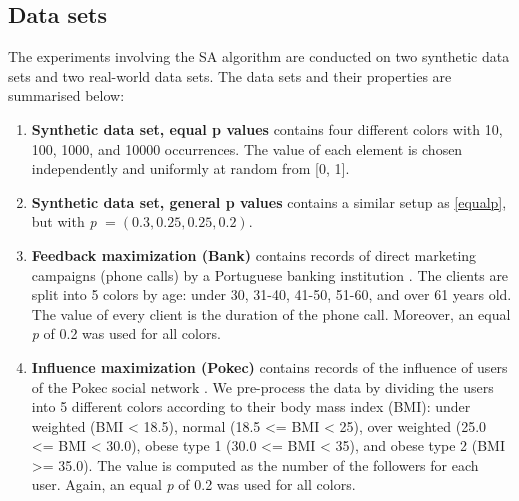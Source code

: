 
\subsection{Data sets}
The experiments involving the SA algorithm are conducted on two synthetic data sets and two real-world data sets. The data sets and their properties are summarised below:

\begin{enumerate}
    \item \textbf{Synthetic data set, equal p values} contains four different colors with 10, 100, 1000, and 10000 occurrences. The value of each element is chosen independently and uniformly at random from [0, 1]. \label{equalp}
    \item \textbf{Synthetic data set, general p values} contains a similar setup as \ref{equalp}, but with \textit{p} $= (0.3, 0.25, 0.25, 0.2)$.
    \item \textbf{Feedback maximization (Bank)} contains records of direct marketing campaigns (phone calls) by a Portuguese banking institution \citep{bankport}. The clients are split into 5 colors by age: under 30, 31-40, 41-50, 51-60, and over 61 years old. The value of every client is the duration of the phone call. Moreover, an equal \textit{p} of 0.2 was used for all colors.

    \item \textbf{Influence maximization (Pokec)} contains records of the influence of users of the Pokec social network \citep{pokec}. We pre-process the data by dividing the users into 5 different colors according to their body mass index (BMI): under weighted (BMI < 18.5), normal (18.5 <= BMI < 25), over weighted (25.0 <= BMI < 30.0), obese type 1 (30.0 <= BMI < 35), and obese type 2 (BMI >= 35.0). The value is computed as the number of the followers for each user. Again, an equal \textit{p} of 0.2 was used for all colors.
    \end{enumerate}

